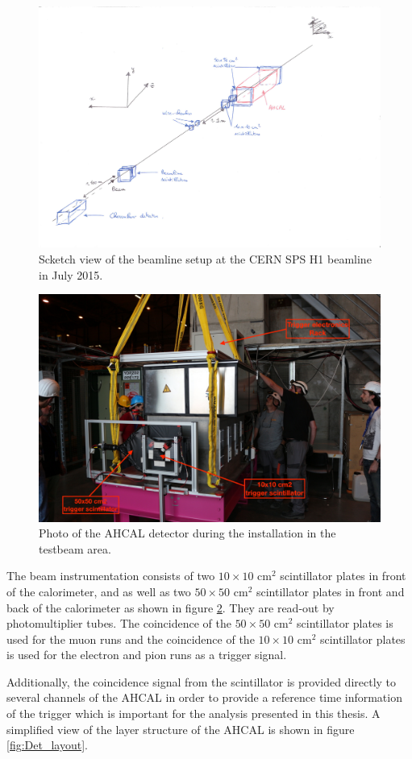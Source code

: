 \begin{figure}[htbp!]
	\centering
	\includegraphics[width=0.7\linewidth]{chap5/fig_EnergyCalib/TestbeamSetupSketch.pdf}
	\caption{Scketch view of the beamline setup at the CERN SPS H1 beamline in July 2015.} \label{fig:TestbeamScketch}
\end{figure}

\begin{figure}[htbp!]
	\centering
	\includegraphics[width=0.7\linewidth]{chap5/fig_EnergyCalib/IMG_1170_copy.jpg}
	\caption{Photo of the AHCAL detector during the installation in the testbeam area.} \label{fig:AHCAL_photo}
\end{figure}

The beam instrumentation consists of two $10\times10$ cm$^2$ scintillator plates in front of the calorimeter, and as well as two $50\times50$ cm$^2$ scintillator plates in front and back of the calorimeter as shown in figure \ref{fig:AHCAL_photo}. They are read-out by photomultiplier tubes. The coincidence of the $50\times50$ cm$^2$ scintillator plates is used for the muon runs and the coincidence of the $10\times10$ cm$^2$ scintillator plates is used for the electron and pion runs as a trigger signal.

Additionally, the coincidence signal from the scintillator is provided directly to several channels of the AHCAL in order to provide a reference time information of the trigger which is important for the analysis presented in this thesis. A simplified view of the layer structure of the AHCAL is shown in figure \ref{fig:Det_layout}.

